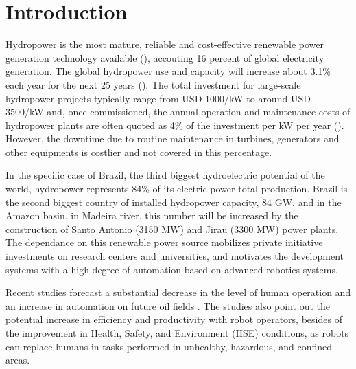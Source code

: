 \section{Introduction}
Hydropower is the most mature, reliable and cost-effective
renewable power generation technology available (\cite{brown}), accouting 16
percent of global electricity generation. The global hydropower use and
capacity will increase about 3.1\% each year for the next 25 years (\cite{wi}).
The total investment for large-scale hydropower projects
typically range from USD 1000/kW to around USD 3500/kW and, once commissioned,
the annual operation and maintenance costs of hydropower plants are often quoted as 4\% of the investment
per kW per year (\cite{ecofys}). However, the downtime due to routine
maintenance in turbines, generators and other equipments is costlier and not
covered in this percentage. 

 
In the specific case of Brazil, the third biggest hydroelectric potential of
the world, hydropower represents 84\% of its electric power total production.
Brazil is the second biggest country of installed hydropower capacity, 84 GW,
and in the Amazon basin, in Madeira river, this number will be increased by
the construction of Santo Antonio (3150 MW) and Jirau (3300 MW) power plants.
The dependance on this renewable power source mobilizes private initiative
investments on research centers and universities, and motivates the development
systems with a high degree of automation based on advanced robotics systems.



Recent studies forecast a substantial decrease in the level of human operation
and an increase in automation on future oil fields .
The studies also point out the potential increase
in efficiency and productivity with robot operators, besides of the improvement in
Health, Safety, and Environment (HSE) conditions, as robots can replace humans
in tasks performed in unhealthy, hazardous, and confined areas.

